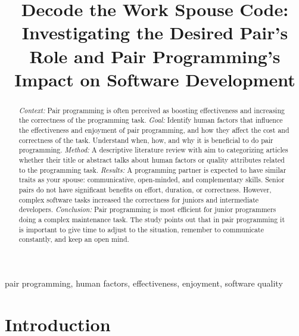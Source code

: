 \documentclass[conference]{IEEEtran}
\begin{document}
\title{Decode the Work Spouse Code: Investigating the Desired Pair's Role and Pair Programming's Impact on Software Development}


\author{
}

\maketitle

\begin{abstract}
\textit{Context:} Pair programming is often perceived as boosting effectiveness and increasing the correctness of the programming task.
\textit{Goal:} Identify human factors that influence the effectiveness and enjoyment of pair programming, and how they affect the cost and correctness of the task. Understand when, how, and why it is beneficial to do pair programming.
\textit{Method:} A descriptive literature review with aim to categorizing articles whether their title or abstract talks about human factors or quality attributes related to the programming task.
\textit{Results:} A programming partner is expected to have similar traits as your spouse: communicative, open-minded, and complementary skills. Senior pairs do not have significant benefits on effort, duration, or correctness. However, complex software tasks increased the correctness for juniors and intermediate developers. 
\textit{Conclusion:} Pair programming is most efficient for junior programmers doing a complex maintenance task. The study points out that in pair programming it is important to give time to adjust to the situation, remember to communicate constantly, and keep an open mind.
\end{abstract}

\begin{IEEEkeywords}
pair programming, human factors, effectiveness, enjoyment, software quality
\end{IEEEkeywords}

\section{Introduction}
\end{document}
